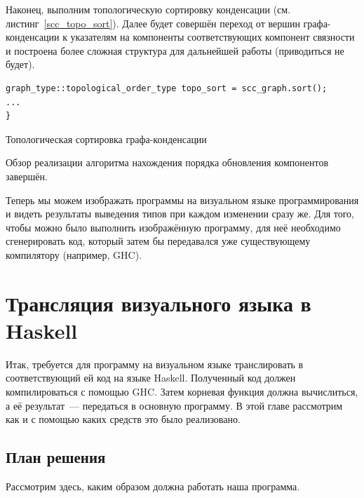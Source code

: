Наконец, выполним топологическую сортировку конденсации (см. листинг~\ref{scc_topo_sort}). Далее будет совершён переход от вершин графа-конденсации к указателям на компоненты соответствующих компонент связности и построена более сложная структура для дальнейшей работы (приводиться не будет).

\begin{ListingEnv}[h]
	\begin{lstlisting}
graph_type::topological_order_type topo_sort = scc_graph.sort();
...
}
	\end{lstlisting}
	\caption{Топологическая сортировка графа-конденсации}\label{scc_topo_sort}
\end{ListingEnv}
Обзор реализации алгоритма нахождения порядка обновления компонентов завершён.

Теперь мы можем изображать программы на визуальном языке программирования и видеть результаты выведения типов при каждом изменении сразу же. Для того, чтобы можно было выполнить изображённую программу, для неё необходимо сгенерировать код, который затем бы передавался уже существующему компилятору (например, GHC).

\chapter{Трансляция визуального языка в Haskell}
Итак, требуется для программу на визуальном языке транслировать в соответствующий ей код на языке Haskell. Полученный код должен компилироваться с помощью GHC. Затем корневая функция должна вычислиться, а её результат~--- передаться в основную программу. В этой главе рассмотрим как и с помощью каких средств это было реализовано.
\section{План решения}
Рассмотрим здесь, каким образом должна работать наша программа.

